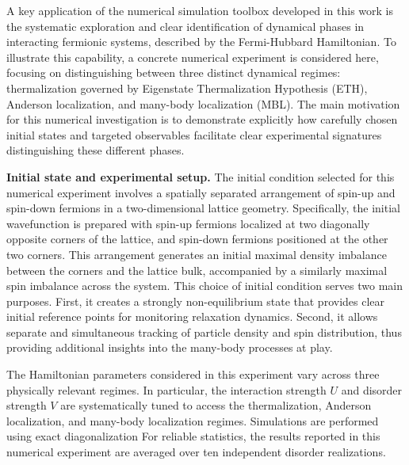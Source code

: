 

A key application of the numerical simulation toolbox developed in this work is the systematic exploration and clear identification of dynamical phases in interacting fermionic systems, described by the Fermi-Hubbard Hamiltonian. To illustrate this capability, a concrete numerical experiment is considered here, focusing on distinguishing between three distinct dynamical regimes: thermalization governed by Eigenstate Thermalization Hypothesis (ETH), Anderson localization, and many-body localization (MBL). The main motivation for this numerical investigation is to demonstrate explicitly how carefully chosen initial states and targeted observables facilitate clear experimental signatures distinguishing these different phases.

\textbf{Initial state and experimental setup.}
The initial condition selected for this numerical experiment involves a spatially separated arrangement of spin-up and spin-down fermions in a two-dimensional lattice geometry. Specifically, the initial wavefunction is prepared with spin-up fermions localized at two diagonally opposite corners of the lattice, and spin-down fermions positioned at the other two corners. This arrangement generates an initial maximal density imbalance between the corners and the lattice bulk, accompanied by a similarly maximal spin imbalance across the system. This choice of initial condition serves two main purposes. First, it creates a strongly non-equilibrium state that provides clear initial reference points for monitoring relaxation dynamics. Second, it allows separate and simultaneous tracking of particle density and spin distribution, thus providing additional insights into the many-body processes at play.

The Hamiltonian parameters considered in this experiment vary across three physically relevant regimes. In particular, the interaction strength $U$ and disorder strength $V$ are systematically tuned to access the thermalization, Anderson localization, and many-body localization regimes. Simulations are performed using exact diagonalization 
For reliable statistics, the results reported in this numerical experiment are averaged over ten independent disorder realizations.


